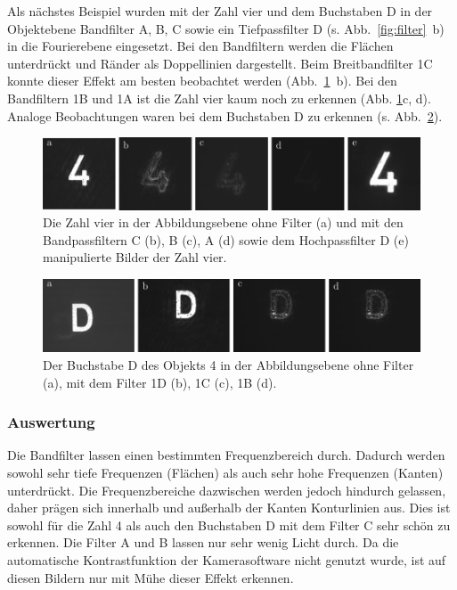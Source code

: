 Als nächstes Beispiel wurden mit der Zahl vier und dem Buchstaben D in der Objektebene Bandfilter A, B, C  sowie ein Tiefpassfilter D (s. Abb.~\ref{fig:filter}~b) in die Fourierebene eingesetzt. Bei den Bandfiltern werden die Flächen unterdrückt und Ränder als Doppellinien dargestellt. Beim Breitbandfilter 1C konnte dieser Effekt am besten beobachtet werden (Abb.~\ref{fig:vier_mit_breitband}~b). Bei den Bandfiltern 1B und 1A ist die Zahl vier kaum noch zu erkennen (Abb. \ref{fig:vier_mit_breitband}c, d). Analoge Beobachtungen waren bei dem Buchstaben D zu erkennen (s. Abb.~\ref{fig:example10_D_filter}).

\begin{figure}[h]
	\centering
	\includegraphics{images/Regina/abb22.pdf}
	\caption[Zahl 4 mit Breitbandfiltern]{
		Die Zahl vier in  der Abbildungsebene ohne Filter (a) und mit den Bandpassfiltern C (b), B (c), A (d) sowie dem Hochpassfilter D (e) manipulierte Bilder der Zahl vier.
	}
	\label{fig:vier_mit_breitband}
\end{figure}

\begin{figure}[h]
	\centering
	\includegraphics{images/ergebniss_D/abb.pdf}
	\caption{
		Der Buchstabe D des Objekts 4 in der Abbildungsebene ohne Filter (a), mit dem Filter 1D (b), 1C (c), 1B (d).
	}
	\label{fig:example10_D_filter}
\end{figure}


\subsubsection*{Auswertung}

Die Bandfilter lassen einen bestimmten Frequenzbereich durch. Dadurch werden sowohl sehr tiefe Frequenzen (Flächen) als auch sehr hohe Frequenzen (Kanten) unterdrückt. Die Frequenzbereiche dazwischen werden jedoch hindurch gelassen, daher prägen sich innerhalb und außerhalb der Kanten Konturlinien aus. Dies ist sowohl für die Zahl 4 als auch den Buchstaben D mit dem Filter C sehr schön zu erkennen. Die Filter A und B lassen nur sehr wenig Licht durch. Da die automatische Kontrastfunktion der Kamerasoftware nicht genutzt wurde, ist auf diesen Bildern nur mit Mühe dieser Effekt erkennen.

